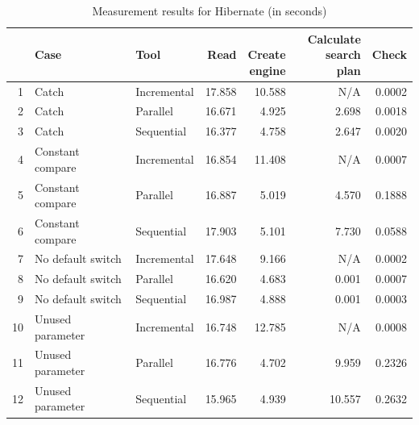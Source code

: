 \begin{table}[!htpb]
	\centering
	\begin{tabular}{rllrrrr}
		\hline
		& Case & Tool & Read & \shortstack{\\Create\\engine} & \shortstack{Calculate\\search plan} & Check \\ 
		\hline \hline
		1 & Catch & Incremental & 17.858 & 10.588 & N/A & 0.0002 \\ 
		2 & Catch & Parallel & 16.671 & 4.925 & 2.698 & 0.0018 \\ 
		3 & Catch & Sequential & 16.377 & 4.758 & 2.647 & 0.0020 \\ 
		\hline
		4 & Constant compare & Incremental & 16.854 & 11.408 & N/A & 0.0007 \\ 
		5 & Constant compare & Parallel & 16.887 & 5.019 & 4.570 & 0.1888 \\ 
		6 & Constant compare & Sequential & 17.903 & 5.101 & 7.730 & 0.0588 \\ 
		\hline
		7 & No default switch & Incremental & 17.648 & 9.166 & N/A & 0.0002 \\ 
		8 & No default switch & Parallel & 16.620 & 4.683 & 0.001 & 0.0007 \\ 
		9 & No default switch & Sequential & 16.987 & 4.888 & 0.001 & 0.0003 \\ 
		\hline
		10 & Unused parameter & Incremental & 16.748 & 12.785 & N/A & 0.0008 \\ 
		11 & Unused parameter & Parallel & 16.776 & 4.702 & 9.959 & 0.2326 \\ 
		12 & Unused parameter & Sequential & 15.965 & 4.939 & 10.557 & 0.2632 \\ 
		\hline
	\end{tabular}
	\caption{Measurement results for Hibernate (in seconds)} 
	\label{tab:hibernate}
\end{table}



